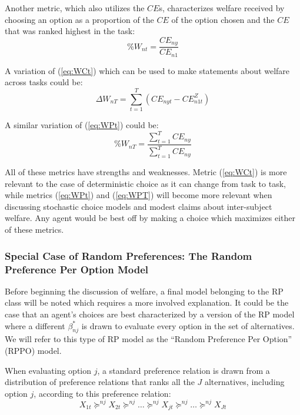 \documentclass[11pt,a4paper]{article}
\newcommand\CE{\ensuremath{\mathit{CE}}}  %
\begin{document}
Another metric, which also utilizes the {\CE}s, characterizes welfare received by choosing an option as a proportion of the {\CE} of the option chosen and the {\CE} that was ranked highest in the task:
\begin{equation}
	\label{eq:WPt}
	\%W_{nt} = \frac{ {\CE}_{ny} }{ {\CE}_{n1} }
\end{equation}

\noindent A variation of (\ref{eq:WCt}) which can be used to make statements about welfare across tasks could be:
\begin{equation}
	\label{eq:WCT}
	\Delta W_{nT} = \sum_{t=1}^T \left( {\CE}_{nyt} - {\CE}_{n1t}^Z \right)
\end{equation}

\noindent A similar variation of (\ref{eq:WPt}) could be:
\begin{equation}
	\label{eq:WPT}
	\%W_{nT} = \frac{\displaystyle\sum_{t=1}^{T} {\CE}_{ny} }{\displaystyle\sum_{t=1}^{T} {\CE}_{ny}}
\end{equation}

All of these metrics have strengths and weaknesses.
Metric (\ref{eq:WCt}) is more relevant to the case of deterministic choice as it can change from task to task, while metrics (\ref{eq:WPt}) and (\ref{eq:WPT}) will become more relevant when discussing stochastic choice models and modest claims about inter-subject welfare.
Any agent would be best off by making a choice which maximizes either of these metrics.

\subsubsection{Special Case of Random Preferences: The Random Preference Per Option Model}

Before beginning the discussion of welfare, a final model belonging to the RP class will be noted which requires a more involved explanation.
It could be the case that an agent's choices are best characterized by a version of the RP model where a different $\beta^*_{nj}$ is drawn to evaluate every option in the set of alternatives.
We will refer to this type of RP model as the \enquote{Random Preference Per Option} (RPPO) model.

When evaluating option $j$, a standard preference relation is drawn from a distribution of preference relations that ranks all the $J$ alternatives, including option $j$, according to this preference relation:
\begin{equation}
	\label{eq:RPPO.jorank}
	X_{1t} \succcurlyeq^{nj} X_{2t} \succcurlyeq^{nj} \ldots \succcurlyeq^{nj} X_{jt} \succcurlyeq^{nj} \ldots \succcurlyeq^{nj} X_{Jt}
\end{equation}
\end{document}
